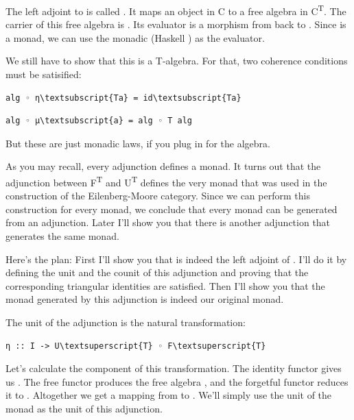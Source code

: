 The left adjoint to  is called . It maps an object
 in C to a free algebra in C\textsuperscript{T}. The carrier
of this free algebra is . Its evaluator is a morphism from
 back to . Since  is a monad,
we can use the monadic  (Haskell ) as the
evaluator.

We still have to show that this is a T-algebra. For that, two coherence
conditions must be satisified:

\begin{Verbatim}[commandchars=\\\{\}]
alg ◦ η\textsubscript{Ta} = id\textsubscript{Ta}
\end{Verbatim}
\begin{Verbatim}[commandchars=\\\{\}]
alg ◦ μ\textsubscript{a} = alg ◦ T alg
\end{Verbatim}
But these are just monadic laws, if you plug in  for the
algebra.

As you may recall, every adjunction defines a monad. It turns out that
the adjunction between F\textsuperscript{T} and U\textsuperscript{T}
defines the very monad  that was used in the construction of
the Eilenberg-Moore category. Since we can perform this construction for
every monad, we conclude that every monad can be generated from an
adjunction. Later I'll show you that there is another adjunction that
generates the same monad.

Here's the plan: First I'll show you that  is indeed the left
adjoint of . I'll do it by defining the unit and the counit
of this adjunction and proving that the corresponding triangular
identities are satisfied. Then I'll show you that the monad generated by
this adjunction is indeed our original monad.

The unit of the adjunction is the natural transformation:

\begin{Verbatim}[commandchars=\\\{\}]
η :: I -> U\textsuperscript{T} ◦ F\textsuperscript{T}
\end{Verbatim}
Let's calculate the  component of this transformation. The
identity functor gives us . The free functor produces the free
algebra , and the forgetful functor reduces it to
. Altogether we get a mapping from  to
. We'll simply use the unit of the monad  as the
unit of this adjunction.

